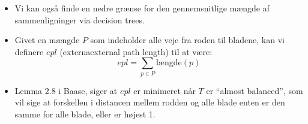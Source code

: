 \begin{frame}[allowframebreaks]
\begin{itemize}
	\item Vi kan også finde en nedre grænse for den gennemsnitlige mængde af sammenligninger via decision trees.
	\item Givet en mængde $P$ som indeholder alle veje fra roden til bladene, kan vi definere $epl$ (externaexternal path length) til at være:
		  \begin{equation*}
			epl = \sum_{p \in P} \text{længde}(p)
		  \end{equation*}
	\item Lemma 2.8 i Baase, siger at $epl$ er minimeret når $T$ er ``almost balanced'', som vil sige at forskellen i distancen mellem rodden og alle blade enten er den samme for alle blade, eller er højest 1.
  \end{itemize}
\end{frame}

